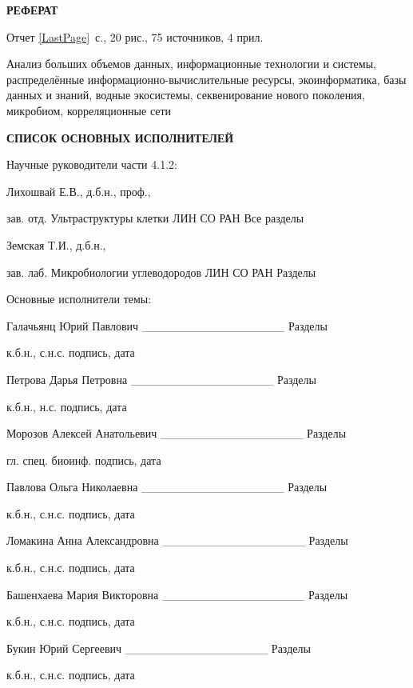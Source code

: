 \documentclass[a4paper,12pt,openany,final]{extreport}
\begin{document}
\begin{titlepage}
  \thispagestyle{empty}
  \begin{center}
    \textbf{РЕФЕРАТ}
  \end{center}

Отчет \ref{LastPage}~с., 20 рис., 75 источников, 4 прил.

Анализ больших объемов данных, информационные технологии и системы,
распределённые информационно-вычислительные ресурсы, экоинформатика,
базы данных и знаний, водные экосистемы, секвенирование нового
поколения, микробиом, корреляционные сети
\end{titlepage}
\begin{titlepage}
  \thispagestyle{empty}
\begin{center}\bfseries
  СПИСОК ОСНОВНЫХ ИСПОЛНИТЕЛЕЙ
  \end{center}

Научные руководители части 4.1.2:

Лихошвай Е.В., д.б.н., проф.,

зав. отд. Ультраструктуры клетки ЛИН СО РАН Все разделы

Земская Т.И., д.б.н.,

зав. лаб. Микробиологии углеводородов ЛИН СО РАН Разделы

Основные исполнители темы:

Галачьянц Юрий Павлович \_\_\_\_\_\_\_\_\_\_\_\_\_\_\_\_\_ Разделы

к.б.н., с.н.с. подпись, дата

Петрова Дарья Петровна \_\_\_\_\_\_\_\_\_\_\_\_\_\_\_\_\_ Разделы

к.б.н., н.с. подпись, дата

Морозов Алексей Анатольевич \_\_\_\_\_\_\_\_\_\_\_\_\_\_\_\_\_ Разделы

гл. спец. биоинф. подпись, дата

Павлова Ольга Николаевна \_\_\_\_\_\_\_\_\_\_\_\_\_\_\_\_\_ Разделы

к.б.н., с.н.с. подпись, дата

Ломакина Анна Александровна \_\_\_\_\_\_\_\_\_\_\_\_\_\_\_\_\_ Разделы

к.б.н., с.н.с. подпись, дата

Башенхаева Мария Викторовна \_\_\_\_\_\_\_\_\_\_\_\_\_\_\_\_\_ Разделы

к.б.н., с.н.с. подпись, дата

Букин Юрий Сергеевич \_\_\_\_\_\_\_\_\_\_\_\_\_\_\_\_\_ Разделы

к.б.н., с.н.с. подпись, дата


\end{titlepage}
\end{document}
